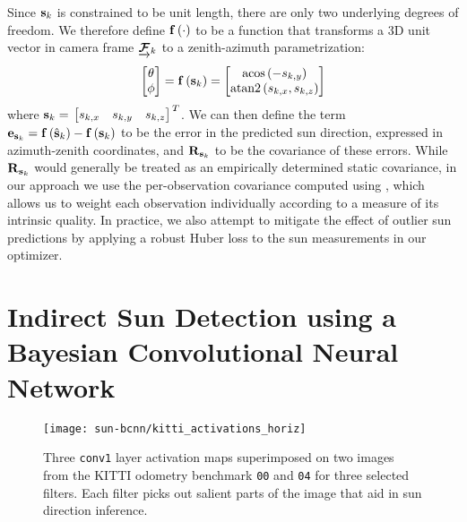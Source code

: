 Since $\boldsymbol{\mathbf{s}}_k$ is constrained to be unit length, there are only two underlying degrees of freedom.
We therefore define $\boldsymbol{\mathbf{f}}\left(\cdot\right)$ to be a function that transforms a 3D unit vector in camera frame $\underrightarrow{ \boldsymbol{\mathbf{\mathcal{F}}} }_{k}$ to a zenith-azimuth parametrization:
\begin{equation} \label{eq:vec-to-az-zen}
	\begin{bmatrix} \theta \\ \phi \end{bmatrix}
    = \boldsymbol{\mathbf{f}} \left( \boldsymbol{\mathbf{s}}_k \right)
    = \begin{bmatrix} \text{acos}\left( -s_{k,y} \right) \\ \text{atan2}\left(s_{k,x}, s_{k,z} \right) \end{bmatrix}
\end{equation}
where $\boldsymbol{\mathbf{s}}_k = \left.{\begin{bmatrix} s_{k,x} & s_{k,y} & s_{k,z} \end{bmatrix}}\right.^T$.
We can then define the term $\boldsymbol{\mathbf{e}}_{\boldsymbol{\mathbf{s}}_k} = \boldsymbol{\mathbf{f}}\left(\hat{\boldsymbol{\mathbf{s}}}_k\right) - \boldsymbol{\mathbf{f}}\left(\boldsymbol{\mathbf{s}}_k\right)$ to be the error in the predicted sun direction, expressed in azimuth-zenith coordinates, and $\boldsymbol{\mathbf{R}}_{\boldsymbol{\mathbf{s}}_k}$ to be the covariance of these errors.
While $\boldsymbol{\mathbf{R}}_{\boldsymbol{\mathbf{s}}_k}$ would generally be treated as an empirically determined static covariance, in our approach we use the per-observation covariance computed using , which allows us to weight each observation individually according to a measure of its intrinsic quality.
In practice, we also attempt to mitigate the effect of outlier sun predictions by applying a robust Huber loss to the sun measurements in our optimizer.




\section{Indirect Sun Detection using a Bayesian Convolutional Neural Network} \label{sec:sun-bcnn}

\begin{figure}
    \centering
    \texttt{[image: sun-bcnn/kitti\_activations\_horiz]}
    \caption{Three \texttt{conv1} layer activation maps superimposed on two images from the KITTI odometry benchmark \citep{Geiger2013-ky} \texttt{00} and \texttt{04} for three selected filters. Each filter picks out salient parts of the image that aid in sun direction inference.}
    \label{fig:sun-bcnn_kitti_cnn_activations}
\end{figure}

